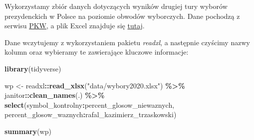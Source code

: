 \documentclass[
]{book}
\newenvironment{Shaded}{\begin{snugshade}}{\end{snugshade}}
\newcommand{\KeywordTok}[1]{\textcolor[rgb]{0.13,0.29,0.53}{\textbf{#1}}}
\newcommand{\NormalTok}[1]{#1}
\newcommand{\OperatorTok}[1]{\textcolor[rgb]{0.81,0.36,0.00}{\textbf{#1}}}
\newcommand{\StringTok}[1]{\textcolor[rgb]{0.31,0.60,0.02}{#1}}
\begin{document}
Wykorzystamy zbiór danych dotyczących wyników drugiej tury wyborów prezydenckich w Polsce na poziomie obwodów wyborczych. Dane pochodzą z serwisu \href{https://prezydent20200628.pkw.gov.pl/prezydent20200628/pl/dane_w_arkuszach}{PKW}, a plik Excel znajduje się \href{data/wybory2020.xlsx}{tutaj}.

Dane wczytujemy z wykorzystaniem pakietu \emph{readxl}, a następnie czyścimy nazwy kolumn oraz wybieramy te zawierające kluczowe informacje:

\begin{Shaded}
\begin{Highlighting}[]
\KeywordTok{library}\NormalTok{(tidyverse)}

\NormalTok{wp \textless{}{-}}\StringTok{ }\NormalTok{readxl}\OperatorTok{::}\KeywordTok{read\_xlsx}\NormalTok{(}\StringTok{"data/wybory2020.xlsx"}\NormalTok{) }\OperatorTok{\%\textgreater{}\%}\StringTok{ }
\StringTok{  }\NormalTok{janitor}\OperatorTok{::}\KeywordTok{clean\_names}\NormalTok{(.) }\OperatorTok{\%\textgreater{}\%}\StringTok{  }
\StringTok{  }\KeywordTok{select}\NormalTok{(symbol\_kontrolny}\OperatorTok{:}\NormalTok{percent\_glosow\_niewaznych, percent\_glosow\_waznych}\OperatorTok{:}\NormalTok{rafal\_kazimierz\_trzaskowski)}

\KeywordTok{summary}\NormalTok{(wp)}
\end{Highlighting}
\end{Shaded}
\end{document}
